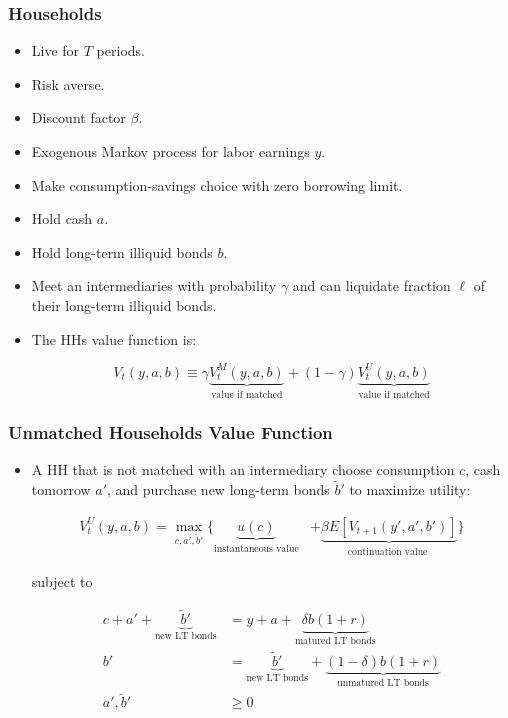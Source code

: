 \documentclass[handout]{beamer}
\begin{document}
\begin{frame}
\frametitle{Households}

\begin{itemize}[<+->]

\item Live for $T$ periods.
\item Risk averse.
\item Discount factor $\beta$.
\item Exogenous Markov process for labor earnings $y$.
\item Make consumption-savings choice with zero borrowing limit.
\item Hold cash $a$.
\item Hold long-term illiquid bonds $b$.
\item Meet an intermediaries with probability $\gamma$ and can liquidate fraction $\ell$ of their long-term illiquid bonds.
\item The HHs value function is:

$$
V_t(y, a, b) \equiv \gamma \underbrace{V^M_{t}(y, a, b)}_{\text{value if matched}} + (1-\gamma) \underbrace{V^U_{t}(y, a, b)}_{\text{value if matched}}
$$

\end{itemize}

\end{frame}






\begin{frame}
\frametitle{Unmatched Households Value Function}

\begin{itemize}[<+->]

\item A HH that is not matched with an intermediary choose consumption $c$, cash tomorrow $a'$, and purchase new long-term bonds $\tilde{b}'$ to maximize utility:

\begin{align*}
V_{t}^U(y, a, b) 
= \max_{c, a', \tilde{b}'} 
\Bigg\{ 
\underbrace{u(c)}_{\text{instantaneous value}} 
&+ \underbrace{\beta E[V_{t+1}(y', a', b')]}_{\text{continuation value }} \Bigg\}
\end{align*}

subject to

\begin{align*}
c + a' + \underbrace{\tilde{b}'}_{\text{new LT bonds}} &= y + a + \underbrace{\delta b (1 + r)}_{\text{matured LT bonds}} \\ 
b' &= \underbrace{\tilde{b}'}_{\text{new LT bonds}} + \underbrace{(1-\delta)b(1+r)}_{\text{unmatured LT bonds}}\\
a', \tilde{b}' &\ge 0
\end{align*}

\end{itemize}

\end{frame}
\end{document}
